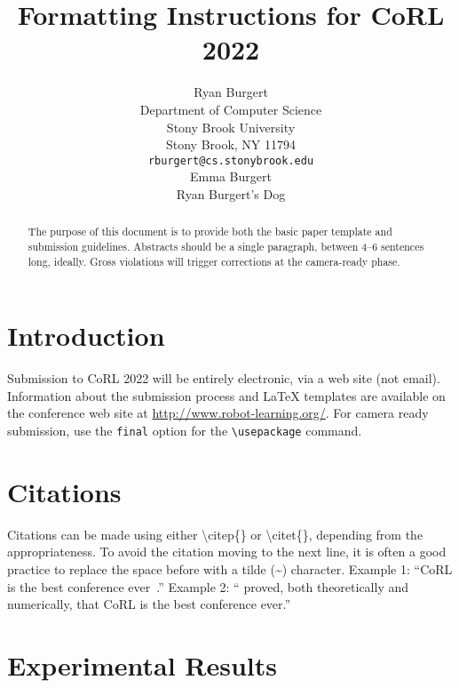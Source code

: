 \documentclass{article}
\title{Formatting Instructions for CoRL 2022}
\author{%
	Ryan Burgert \\
	Department of Computer Science\\
	Stony Brook University\\
	Stony Brook, NY 11794 \\
	\texttt{rburgert@cs.stonybrook.edu} \\
	\And
	Emma Burgert \\
	Ryan Burgert's Dog\\
}
\begin{document}
\maketitle


\begin{abstract}
    The purpose of this document is to provide both the basic paper template and submission guidelines. Abstracts should be a single paragraph, between 4--6 sentences long, ideally. Gross violations will trigger corrections at the camera-ready phase.
\end{abstract}



\section{Introduction}
	
    Submission to CoRL 2022 will be entirely electronic, via a web site (not email). Information about the submission process and \LaTeX{} templates are available on the conference web site at \url{http://www.robot-learning.org/}. For camera ready submission, use the \texttt{final} option for the \texttt{\textbackslash usepackage} command. 


\section{Citations}
\label{sec:citations}

	Citations can be made using either \textbackslash citep\{\} or \textbackslash citet\{\}, depending from the appropriateness. To avoid the citation moving to the next line, it is often a good practice to replace the space before with a tilde (\~{}) character.
	Example 1: ``CoRL is the best conference ever~\citep{Gauss1857}.''
	Example 2: ``\citet{Gauss1857} proved, both theoretically and numerically, that CoRL is the best conference ever.''
	

\section{Experimental Results}
\label{sec:result}
\end{document}
